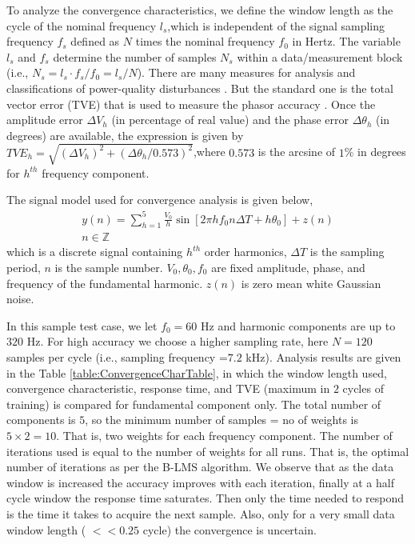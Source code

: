 \documentclass{UCF_ETD}
\begin{document}
To analyze the convergence characteristics, we define the window length as the cycle of the nominal frequency $l_s$,which
is independent of the signal sampling frequency $f_s$ defined as $N$ times the nominal frequency $f_0$ in Hertz. The variable $l_s$ and  $f_s$ determine the number of samples $N_s$ within a data/measurement  block (i.e., $N_s=l_s\cdot f_s/f_0=l_s/N$). There are many measures for analysis and classifications of power-quality disturbances \cite{Bollen2006}. But the standard one is the total vector error (TVE) that is used to measure the phasor accuracy \cite{IEEE2006}. Once the amplitude error $\Delta V_h$ (in percentage of real value) and the phase error $\Delta \theta_h$ (in degrees) are available, the expression is given by 
$ {TVE}_h=\sqrt{(\Delta V_h)^2+(\Delta \theta _h /0.573)^2} $,where $0.573$ is the arcsine of $1$\% in degrees for $h^{th}$ frequency component.

The signal model used for convergence analysis is given below,
\begin{eqnarray*}
y(n)=\sum\limits_{h=1}^{5}\frac{V_0}{h} \sin[2 \pi h f_0 n \Delta T+h \theta_0]+z(n)\\
n \in \mathbb{Z}
\end{eqnarray*}
which is a discrete signal containing $h^{th}$ order harmonics, $\Delta T$ is the sampling period, $n$ is the sample number. $V_0,\theta_0,f_0$ are fixed amplitude, phase, and frequency of the fundamental harmonic. $z(n)$ is zero mean white Gaussian noise.

In this sample test case, we let $f_0=60$ Hz and harmonic components are up to $320$ Hz. For high accuracy we choose a higher sampling rate, here $N = 120$ samples per cycle (i.e., sampling frequency =$7.2$ kHz). Analysis results are given in the Table \ref{table:ConvergenceCharTable}, in which the window length used, convergence characteristic, response time, and TVE (maximum in $2$ cycles of training) is compared for fundamental component only. The total number of components is $5$, so the minimum number of samples = no of weights is $5\times 2 = 10$. That is, two weights for each frequency component. The number of iterations used is equal to the number of weights for all runs. That is, the optimal number of iterations as per the B-LMS algorithm. We observe that as the data window is increased the accuracy improves with each iteration, finally at a half cycle window the response time saturates. Then only the time needed to respond is the time it takes to acquire the next sample. Also, only for a very small data window length ( $<<0.25$  cycle) the convergence is uncertain.
\end{document}
